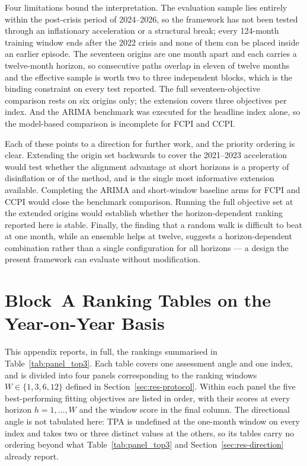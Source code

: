 \documentclass[12pt]{article}
\begin{document}
Four limitations bound the interpretation. The evaluation sample lies entirely
within the post-crisis period of 2024--2026, so the framework has not been
tested through an inflationary acceleration or a structural break; every
124-month training window ends after the 2022 crisis and none of them can be
placed inside an earlier episode. The seventeen origins are one month apart and
each carries a twelve-month horizon, so consecutive paths overlap in eleven of
twelve months and the effective sample is worth two to three independent
blocks, which is the binding constraint on every test reported. The full
seventeen-objective comparison rests on six origins only; the extension covers
three objectives per index. And the ARIMA benchmark was executed for the
headline index alone, so the model-based comparison is incomplete for FCPI and
CCPI.

Each of these points to a direction for further work, and the priority ordering
is clear. Extending the origin set backwards to cover the 2021--2023
acceleration would test whether the alignment advantage at short horizons is a
property of disinflation or of the method, and is the single most informative
extension available. Completing the ARIMA and short-window baseline arms for
FCPI and CCPI would close the benchmark comparison. Running the
full objective set at the extended origins would establish whether the
horizon-dependent ranking reported here is stable. Finally, the finding that a
random walk is difficult to beat at one month, while an ensemble helps at
twelve, suggests a horizon-dependent combination rather than a single
configuration for all horizons --- a design the present framework can evaluate
without modification.







\clearpage

\appendix
\section{Block~A Ranking Tables on the Year-on-Year Basis}
\label{app:blockA-tables}

This appendix reports, in full, the rankings summarised in
Table~\ref{tab:panel_top3}. Each table covers one assessment angle and one
index, and is divided into four panels corresponding to the ranking windows
$W \in \{1,3,6,12\}$ defined in Section~\ref{sec:res-protocol}. Within each
panel the five best-performing fitting objectives are listed in order, with
their scores at every horizon $h=1,\dots,W$ and the window score in the final
column. The directional angle is not tabulated here: TPA is undefined at the
one-month window on every index and takes two or three distinct values at the
others, so its tables carry no ordering beyond what
Table~\ref{tab:panel_top3} and Section~\ref{sec:res-direction} already
report.
\end{document}
